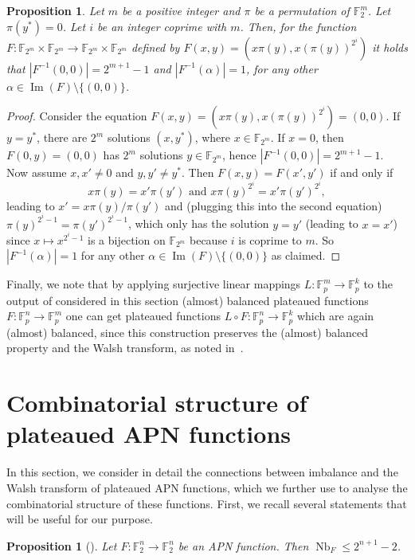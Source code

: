 \documentclass[11pt]{article}
\newcommand{\F}{\mathbb F}
\DeclareMathOperator{\Nb}{Nb}
\theoremstyle{plain}
\newtheorem{proposition}[theorem]{Proposition}
\theoremstyle{definition}
\numberwithin{theorem}{section}
\numberwithin{equation}{section}
\numberwithin{table}{section}
\numberwithin{figure}{section}
\DeclareMathOperator{\image}{Im}
\begin{document}
{\begin{proposition}\label{prop: MM2}
    Let $m$ be a positive integer and $\pi$ be a permutation of $\F_2^m$. Let $\pi(y^*)=0$. Let $i$ be an integer coprime with $m$. Then, for the function $F\colon\F_{2^m}\times\F_{2^m}\to\F_{2^m}\times\F_{2^m}$ defined by $F(x, y) = (x\pi(y), x(\pi(y))^{2^i})$ it holds that $|F^{-1}(0,0)|=2^{m+1}-1$ and $|F^{-1}(\alpha)|=1$, for any other $\alpha\in\image(F)\setminus\{(0,0)\}$.
\end{proposition}
\begin{proof}
    Consider the equation $F(x,y)=(x\pi(y) , x(\pi(y))^{2^i})=(0,0)$. If $y=y^*$, there are $2^m$ solutions $(x,y^*)$, where $x\in\F_{2^m}$. If $x=0$, then $F(0,y)=(0,0)$ has $2^m$ solutions $y\in\F_{2^m}$, hence $|F^{-1}(0,0)|=2^{m+1}-1$. Now assume $x,x' \neq 0$ and $y,y'\neq y^*$. Then $F(x,y)=F(x',y')$ if and only if 
    \[x\pi(y)=x'\pi(y') \text{ and } x\pi(y)^{2^i}=x'\pi(y')^{2^i},\]
    leading to $x'=x\pi(y)/\pi(y')$ and (plugging this into the second equation) $\pi(y)^{2^i-1}=\pi(y')^{2^i-1}$, which only has the solution $y=y'$ (leading to $x=x'$) since $x \mapsto x^{2^i-1}$ is a bijection on $\F_{2^m}$ because $i$ is coprime to $m$. So $|F^{-1}(\alpha)|=1$ for any other $\alpha\in\image(F)\setminus\{(0,0)\}$ as claimed.
\end{proof}

Finally, we note that by applying surjective linear mappings $L\colon\F_p^m\to\F_p^{k}$ to the output of considered in this section (almost) balanced plateaued functions $F\colon\F_p^n\to\F_p^m$ one can get plateaued functions $L\circ F\colon\F_p^n\to\F_p^k$ which are again (almost) balanced, since this construction preserves the (almost) balanced property and the Walsh transform, as noted in~\cite{KoelschPolujan2024}.

\section{Combinatorial structure of plateaued APN functions} \label{sec:APN}

In this section, we consider in detail the connections between imbalance and the Walsh transform of plateaued APN functions, which we further use to analyse the combinatorial structure of these functions. First, we recall several statements that will be useful for our purpose.
\begin{proposition}[{\cite[Lemma 2]{Koelsch2023}}]\label{prop:KKK}
    Let $F \colon \F_2^n \rightarrow \F_2^n$ be an APN function. Then $\Nb_F \leq 2^{n+1}-2$.
\end{proposition}

}
\end{document}
